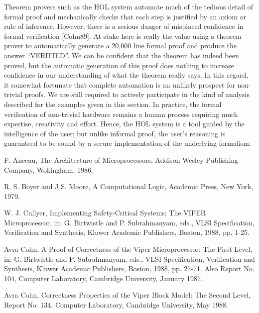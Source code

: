 \begin{normalsize}
Theorem provers such as the HOL system
automate much of the tedious detail of formal proof and
mechanically checks that each step is justified
by an axiom or rule of inference.
However, there is a serious danger of misplaced confidence in
formal verification [Cohn89].
At stake here is really the value using a theorem prover to
automatically generate a 20,000 line formal proof and produce
the answer ``VERIFIED''.
We can be confident that the theorem has indeed been proved, but
the automatic generation of this proof does nothing
to increase confidence in our understanding of what the theorem
really says.
In this regard, it somewhat fortunate that complete automation
is an unlikely prospect for non-trivial proofs.
We are still required to actively participate in the kind of
analysis described for the examples given in this section.
In practice, the formal verification of non-trivial hardware
remains a human process requiring much expertise,
creativity and effort.
Hence, the HOL system is a tool guided by the intelligence of the user;
but unlike informal proof,
the user's reasoning is guaranteed to be sound
by a secure implementation of the underlying formalism.

\newpage
\begin{thebibliography}{12}

\setlength{\parskip}{0mm}

F. Anceau,
The Architecture of Microprocessors,
Addison-Wesley Publishing Company, Wokingham, 1986.

R. S. Boyer and J S. Moore,
A Computational Logic,
Academic Press, New York, 1979.

W. J. Cullyer,
Implementing Safety-Critical Systems:  The VIPER Microprocessor, in:
G. Birtwistle and P. Subrahmanyam, eds.,
VLSI Specification, Verification and Synthesis,
Kluwer Academic Publishers, Boston, 1988,
pp. 1-25.

Avra Cohn,
A Proof of Correctness of the Viper Microprocessor:  The First Level, in:
G. Birtwistle and P. Subrahmanyam, eds.,
VLSI Specification, Verification and Synthesis,
Kluwer Academic Publishers, Boston, 1988,
pp. 27-71.
Also Report No. 104, Computer Laboratory, Cambridge University,
January 1987.

Avra Cohn,
Correctness Properties of the Viper Block Model:  The Second Level,
Report No. 134, Computer Laboratory, Cambridge University,
May 1988. 


\end{thebibliography}
\end{normalsize}
